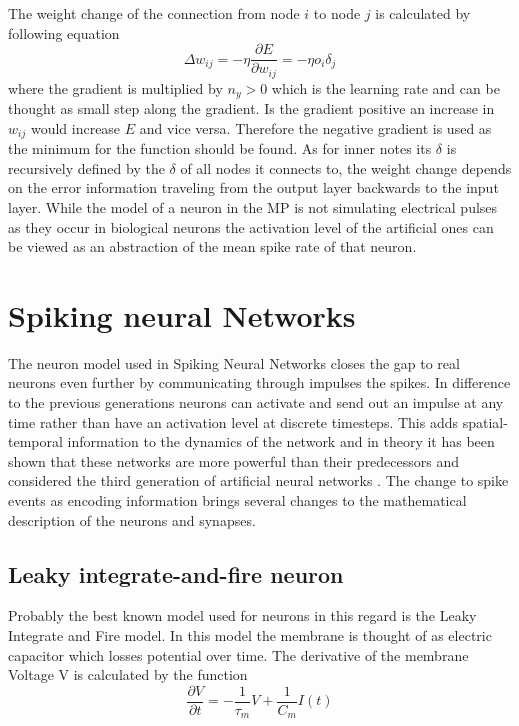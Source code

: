 The weight change of the connection from node $i$ to node $j$ is calculated by following equation
\begin{equation}
  \Delta w_{ij} = -\eta \frac{\partial E}{\partial w_{ij}} = - \eta o_i \delta_j
\end{equation}
where the gradient is multiplied by $n_y > 0$ which is the learning rate and can be thought as small step along the gradient. Is the gradient positive an increase in $w_{ij}$ would increase $E$ and vice versa. Therefore the negative gradient is used as the minimum for the function should be found. As for inner notes its $\delta$ is recursively defined by the $\delta$ of all nodes it connects to, the weight change depends on the error information traveling from the output layer backwards to the input layer\cite{sporea2013supervised}.
\newline
While the model of a neuron in the MP is not simulating electrical pulses as they occur in biological neurons the activation level of the artificial ones can be viewed as an abstraction of the mean spike rate of that neuron.



\section{Spiking neural Networks}

The neuron model used in Spiking Neural Networks closes the gap to real neurons even further by communicating through impulses the spikes. In difference to the previous generations neurons can activate and send out an impulse at any time rather than have an activation level at discrete timesteps. This adds spatial-temporal information to the dynamics of the network and in theory it has been shown that these networks are more powerful than their predecessors and considered the third generation of artificial neural networks \cite{maass1997networks}.
\newline
The change to spike events as encoding information brings several changes to the mathematical description of the neurons and synapses.

\subsection{Leaky integrate-and-fire neuron}
Probably the best known model used for neurons in this regard is the Leaky Integrate and Fire model. In this model the membrane is thought of as electric capacitor which losses potential over time. The derivative of the membrane Voltage V is calculated by the function
\begin{equation}
  \frac{\partial V}{\partial t} = - \frac{1}{\tau_m}V + \frac{1}{C_m}I(t)
\end{equation}

